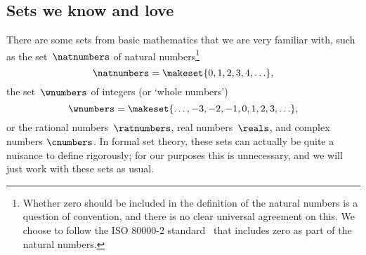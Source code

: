 \subsection{Sets we know and love}

There are some sets from basic mathematics that we are very familiar with, such as
the set~$\natnumbers$ of natural numbers\footnote{
    Whether  zero should be included in the definition of the natural numbers is a question of convention, and there is no clear universal agreement on this.
    We choose to follow the ISO 80000-2 standard~\cite{ISO:2009:IQU} that includes zero as part of the natural numbers.
}
%
\begin{equation*}
    \natnumbers = \makeset{0, 1, 2, 3, 4, \ldots },
\end{equation*}
%
the set~$\wnumbers$ of integers (or `whole numbers')
\begin{equation*}
    \wnumbers = \makeset{ \ldots, -3, -2, -1, 0, 1, 2, 3, \ldots },
\end{equation*}
%
or the rational numbers~$\ratnumbers$, real numbers~$\reals$, and complex numbers $\cnumbers$.
In formal set theory, these sets can actually be quite a nuisance to define rigorously; for our purposes this is unnecessary, and we will just work with these sets as usual.
